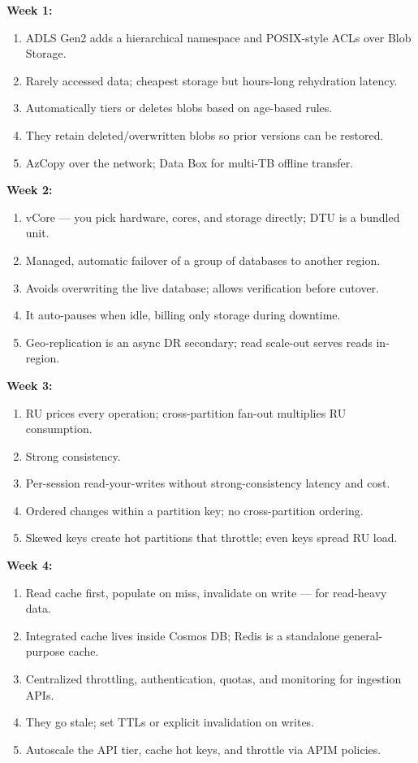 \documentclass[11pt, a4paper]{article}
\begin{document}
\noindent\textbf{Week 1:}
\begin{enumerate}[itemsep=0pt]
    \item ADLS Gen2 adds a hierarchical namespace and POSIX-style ACLs over Blob Storage.
    \item Rarely accessed data; cheapest storage but hours-long rehydration latency.
    \item Automatically tiers or deletes blobs based on age-based rules.
    \item They retain deleted/overwritten blobs so prior versions can be restored.
    \item AzCopy over the network; Data Box for multi-TB offline transfer.
\end{enumerate}
\noindent\textbf{Week 2:}
\begin{enumerate}[itemsep=0pt]
    \item vCore --- you pick hardware, cores, and storage directly; DTU is a bundled unit.
    \item Managed, automatic failover of a group of databases to another region.
    \item Avoids overwriting the live database; allows verification before cutover.
    \item It auto-pauses when idle, billing only storage during downtime.
    \item Geo-replication is an async DR secondary; read scale-out serves reads in-region.
\end{enumerate}
\noindent\textbf{Week 3:}
\begin{enumerate}[itemsep=0pt]
    \item RU prices every operation; cross-partition fan-out multiplies RU consumption.
    \item Strong consistency.
    \item Per-session read-your-writes without strong-consistency latency and cost.
    \item Ordered changes within a partition key; no cross-partition ordering.
    \item Skewed keys create hot partitions that throttle; even keys spread RU load.
\end{enumerate}
\noindent\textbf{Week 4:}
\begin{enumerate}[itemsep=0pt]
    \item Read cache first, populate on miss, invalidate on write --- for read-heavy data.
    \item Integrated cache lives inside Cosmos DB; Redis is a standalone general-purpose cache.
    \item Centralized throttling, authentication, quotas, and monitoring for ingestion APIs.
    \item They go stale; set TTLs or explicit invalidation on writes.
    \item Autoscale the API tier, cache hot keys, and throttle via APIM policies.
\end{enumerate}
\end{document}
